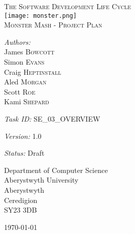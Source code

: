 \documentclass[a4paper]{article}
\begin{document}
\pagestyle{fancy}
\begin{center}
\textsc{\LARGE The Software Development Life Cycle}\\[1.5cm]
\texttt{[image: monster.png]}\\[1.5cm]    
\textsc{\Large Monster Mash - Project Plan}\\[0.5cm]

\begin{minipage}{0.8\textwidth}
\begin{flushleft} \large
\emph{Authors:}\\
James \textsc{Bowcott}\\
Simon \textsc{Evans}\\
Craig \textsc{Heptinstall}\\
Aled \textsc{Morgan}\\
Scott \textsc{Roe}\\
Kami \textsc{Shepard}\\
\end{flushleft}
\end{minipage}
\vspace{8 mm}

\begin{minipage}{0.8\textwidth}
\begin{flushleft} \large
\emph{Task ID:}
SE\_03\_OVERVIEW\\
\end{flushleft}
\end{minipage}
\vspace{8 mm}

\begin{minipage}{0.8\textwidth}
\begin{flushleft} \large
\emph{Version:}
1.0\\
\end{flushleft}
\end{minipage}
\vspace{8 mm}

\begin{minipage}{0.8\textwidth}
\begin{flushleft} \large
\emph{Status:}
Draft \\
\end{flushleft}
\end{minipage}
\vspace{8 mm}

\begin{minipage}{0.8\textwidth}
\begin{flushleft} \large
Department of Computer Science\\
Aberystwyth University\\
Aberystwyth\\
Ceredigion\\
SY23 3DB\\
\end{flushleft}
\end{minipage}
\vfill
{\large \today}
\end{center}
\clearpage
\setlength\parindent{0pt}
\end{document}
